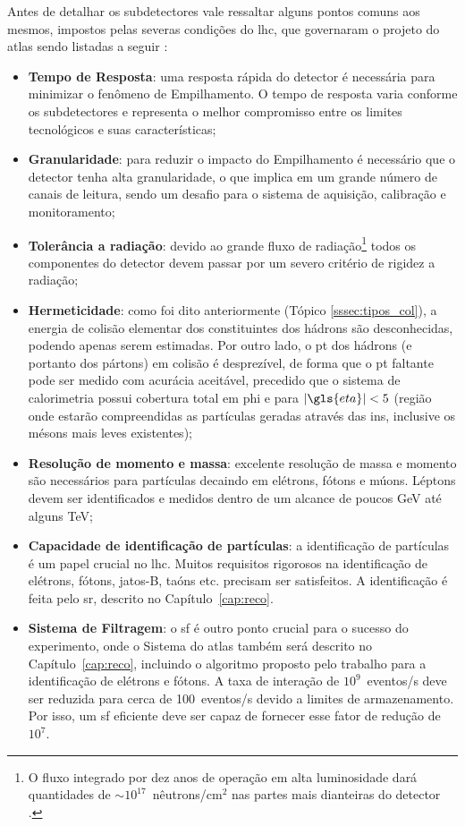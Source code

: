 Antes de detalhar os subdetectores vale ressaltar alguns pontos comuns aos
mesmos, impostos pelas severas condições do \gls{lhc}, que 
governaram o projeto do \gls{atlas} sendo listadas a seguir \cite{THESIS_LAR}:



\begin{itemize}
\item \textbf{Tempo de Resposta}: uma resposta rápida do detector é necessária
para minimizar o fenômeno de Empilhamento. O tempo de resposta varia conforme os
subdetectores e representa o melhor compromisso entre os limites tecnológicos e
suas características;
\item \textbf{Granularidade}: para reduzir o impacto do Empilhamento é
necessário que o detector tenha alta granularidade, o que implica em um grande
número de canais de leitura, sendo um desafio para o sistema de aquisição,
calibração e monitoramento;
\item \textbf{Tolerância a radiação}: devido ao grande fluxo de
radiação\footnote{O fluxo integrado por dez anos de operação em alta
luminosidade dará quantidades de $\sim 10^{17}$~nêutrons/$\text{cm}^2$ nas partes 
mais dianteiras do detector \cite{THESIS_LAR}.} todos os componentes do detector devem passar por 
um severo critério de rigidez a radiação;
\item \textbf{Hermeticidade}: como foi dito anteriormente (Tópico
\ref{sssec:tipos_col}), a energia de colisão elementar dos 
constituintes dos hádrons são desconhecidas, podendo apenas serem estimadas. 
Por outro lado, o \gls{pt} dos hádrons (e portanto dos pártons) 
em colisão é desprezível, de forma que o \acrlong{pt}
faltante pode ser medido com acurácia aceitável, precedido que o sistema de
calorimetria possui cobertura total em \gls{phi} e para $|\gls{eta}|<5$
(região onde estarão compreendidas as partículas geradas através das \glspl{in}, 
inclusive os mésons mais leves existentes);
\item \textbf{Resolução de momento e massa}: excelente resolução de massa e
momento são necessários para partículas decaindo em elétrons, fótons e múons.
Léptons devem ser identificados e medidos dentro de um alcance de poucos GeV até
alguns TeV;
\item \textbf{Capacidade de identificação de partículas}: a identificação de
partículas é um papel crucial no \gls{lhc}. Muitos requisitos rigorosos na
identificação de elétrons, fótons, jatos-B, taóns etc. precisam ser satisfeitos.
A identificação é feita pelo \glsdesc{sr}, descrito no
Capítulo~\ref{cap:reco}.
\item \textbf{Sistema de Filtragem}: o \glsdesc{sf} é outro ponto
crucial para o sucesso do experimento, onde o Sistema do \gls{atlas} também 
será descrito no Capítulo~\ref{cap:reco}, incluindo o algoritmo proposto pelo trabalho para a
identificação de elétrons e fótons. 
A taxa de interação de $10^9$~eventos/s deve ser reduzida para cerca de 
100~eventos/s devido a limites de armazenamento.
Por isso, um \glsdesc{sf} eficiente deve ser capaz de fornecer esse
fator de redução de $10^7$.  
\end{itemize}

